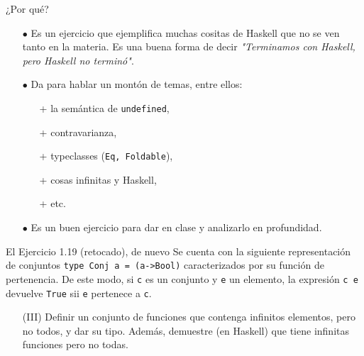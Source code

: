 \documentclass[pdf
]{beamer}
\begin{document}
\begin{frame}{¿Por qué?}

\begin{itemize}
\item[$\bullet$] Es un ejercicio que ejemplifica muchas cositas de Haskell que no se ven tanto en la materia. Es una buena forma de decir \textit{"Terminamos con Haskell, pero Haskell no terminó"}.

\item[$\bullet$] Da para hablar un montón de temas, entre ellos:
\begin{itemize}
\item[+] la semántica de \texttt{undefined},
\item[+] contravarianza,
\item[+] typeclasses (\texttt{Eq, Foldable}),
\item[+] cosas infinitas y Haskell,
\item[+] etc.
\end{itemize}

\item[$\bullet$] Es un buen ejercicio para dar en clase y analizarlo en profundidad.


\end{itemize}

\end{frame}

\begin{frame}{El Ejercicio 1.19 (retocado), de nuevo}
Se cuenta con la siguiente representación de conjuntos \texttt{type Conj a = (a->Bool)} caracterizados por su
función de pertenencia. De este modo, si \texttt{c} es un conjunto y \texttt{e} un elemento, la expresión \texttt{c e} devuelve \texttt{True} sii \texttt{e}
pertenece a \texttt{c}.


\begin{enumerate}[label=(\roman*)]


\item[(III)] Definir un conjunto de funciones que contenga infinitos elementos, pero no todos, y dar su tipo. Además, demuestre (en Haskell) que tiene infinitas funciones pero no todas.


\end{enumerate}

\end{frame}
\end{document}
